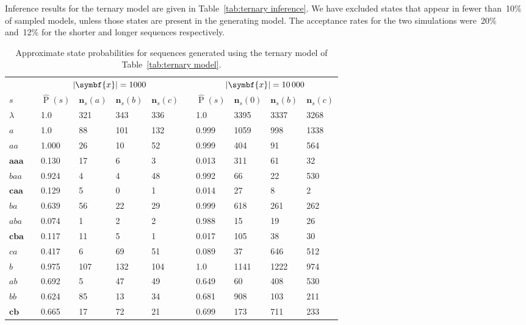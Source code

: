 \documentclass[12pt,a4paper]{article}
\newcommand\ub[1]{\symbf{#1}}                 %
\DeclareMathOperator\Pb{P}                    %
\DeclarePairedDelimiter\abs{\lvert}{\rvert}   %
\begin{document}
Inference results for the ternary model are given in Table~\ref{tab:ternary
inference}. We have excluded states that appear in fewer than~10\% of sampled
models, unless those states are present in the generating model. The acceptance
rates for the two simulations were~20\% and~12\% for the shorter and longer
sequences respectively.
%
\begin{table}[htbp]
\centering
\begin{tabular}{lcllllcllll}
  \toprule
  && \multicolumn{4}{c}{\(\abs{\ub{x}} = 1000\)}
  && \multicolumn{4}{c}{\(\abs{\ub{x}} = 10\,000\)} \\
  \cmidrule{3-6} \cmidrule{8-11}
  \(s\)
  && \(\hat{\Pb}(s)\) & \(\ub{n}_s(a)\) & \(\ub{n}_s(b)\) & \(\ub{n}_s(c)\)
  && \(\hat{\Pb}(s)\) & \(\ub{n}_s(0)\) & \(\ub{n}_s(b)\) & \(\ub{n}_s(c)\) \\
  \midrule
  \(\lambda\)  && 1.0   & 321 & 343 & 336 && 1.0   & 3395 & 3337 & 3268 \\
  \(a\)        && 1.0   & 88  & 101 & 132 && 0.999 & 1059 & 998  & 1338 \\
  \(aa\)       && 1.000 & 26  & 10  & 52  && 0.999 & 404  & 91   & 564  \\
  \(\ub{aaa}\) && 0.130 & 17  & 6   & 3   && 0.013 & 311  & 61   & 32   \\
  \(baa\)      && 0.924 & 4   & 4   & 48  && 0.992 & 66   & 22   & 530  \\
  \(\ub{caa}\) && 0.129 & 5   & 0   & 1   && 0.014 & 27   & 8    & 2    \\
  \(ba\)       && 0.639 & 56  & 22  & 29  && 0.999 & 618  & 261  & 262  \\
  \(aba\)      && 0.074 & 1   & 2   & 2   && 0.988 & 15   & 19   & 26   \\
  \(\ub{cba}\) && 0.117 & 11  & 5   & 1   && 0.017 & 105  & 38   & 30   \\
  \(ca\)       && 0.417 & 6   & 69  & 51  && 0.089 & 37   & 646  & 512  \\
  \(b\)        && 0.975 & 107 & 132 & 104 && 1.0   & 1141 & 1222 & 974  \\
  \(ab\)       && 0.692 & 5   & 47  & 49  && 0.649 & 60   & 408  & 530  \\
  \(bb\)       && 0.624 & 85  & 13  & 34  && 0.681 & 908  & 103  & 211  \\
  \(\ub{cb}\)  && 0.665 & 17  & 72  & 21  && 0.699 & 173  & 711  & 233  \\
  \bottomrule
\end{tabular}
\caption{Approximate state probabilities for sequences generated using the
  ternary model of Table~\ref{tab:ternary model}.}
\label{tab:ternary inference}
\end{table}
\end{document}
